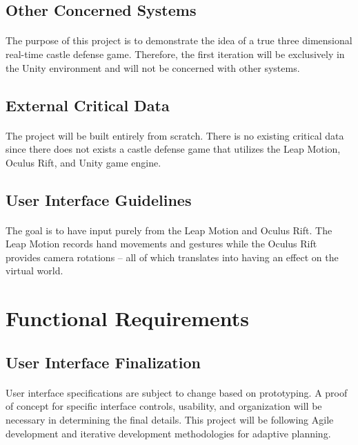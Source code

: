 \subsection{Other Concerned Systems}

\paragraph{} The purpose of this project is to demonstrate the idea of a true three dimensional real-time castle defense game. Therefore, the first iteration will be exclusively in the Unity environment and will not be concerned with other systems.

\subsection{External Critical Data}

\paragraph{} The project will be built entirely from scratch. There is no existing critical data since there does not exists a castle defense game that utilizes the Leap Motion, Oculus Rift, and Unity game engine.

\subsection{User Interface Guidelines}

\paragraph{} The goal is to have input purely from the Leap Motion and Oculus Rift. The Leap Motion records hand movements and gestures while the Oculus Rift provides camera rotations – all of which translates into having an effect on the virtual world.

\section{Functional Requirements}

\subsection{User Interface Finalization}

\paragraph{} User interface specifications are subject to change based on prototyping. A proof of concept for specific interface controls, usability, and organization will be necessary in determining the final details. This project will be following Agile development and iterative development methodologies for adaptive planning.

